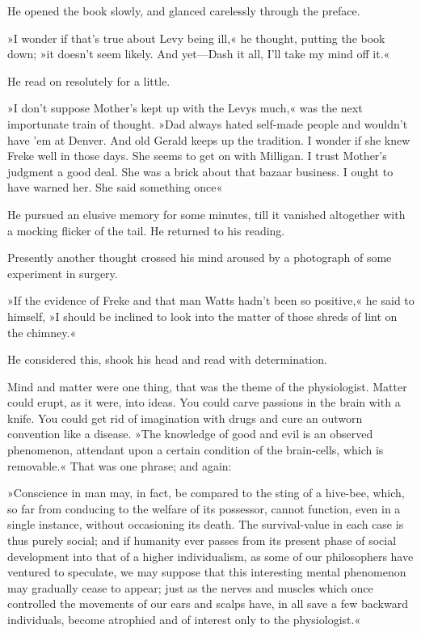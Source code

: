 He opened the book slowly, and glanced carelessly through the preface.

»I wonder if that's true about Levy being ill,« he thought, putting the book down; »it doesn't seem likely. And yet—Dash it all, I'll take my mind off it.«

He read on resolutely for a little.

»I don't suppose Mother's kept up with the Levys much,« was the next importunate train of thought. »Dad always hated self-made people and wouldn't have 'em at Denver. And old Gerald keeps up the tradition. I wonder if she knew Freke well in those days. She seems to get on with Milligan. I trust Mother's judgment a good deal. She was a brick about that bazaar business. I ought to have warned her. She said something once\longdash«

He pursued an elusive memory for some minutes, till it vanished altogether with a mocking flicker of the tail. He returned to his reading.

Presently another thought crossed his mind aroused by a photograph of some experiment in surgery.

»If the evidence of Freke and that man Watts hadn't been so positive,« he said to himself, »I should be inclined to look into the matter of those shreds of lint on the chimney.«

He considered this, shook his head and read with determination.

Mind and matter were one thing, that was the theme of the physiologist. Matter could erupt, as it were, into ideas. You could carve passions in the brain with a knife. You could get rid of imagination with drugs and cure an outworn convention like a disease. »The knowledge of good and evil is an observed phenomenon, attendant upon a certain condition of the brain-cells, which is removable.« That was one phrase; and again:

»Conscience in man may, in fact, be compared to the sting of a hive-bee, which, so far from conducing to the welfare of its possessor, cannot function, even in a single instance, without occasioning its death. The survival-value in each case is thus purely social; and if humanity ever passes from its present phase of social development into that of a higher individualism, as some of our philosophers have ventured to speculate, we may suppose that this interesting mental phenomenon may gradually cease to appear; just as the nerves and muscles which once controlled the movements of our ears and scalps have, in all save a few backward individuals, become atrophied and of interest only to the physiologist.«

